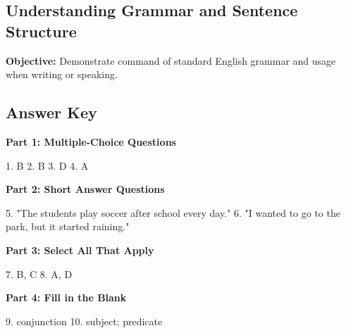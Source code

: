 \documentclass[12pt]{article}
\begin{document}
\subsection*{Understanding Grammar and Sentence Structure}
\onehalfspacing

\begin{tcolorbox}[colframe=black!40, colback=gray!0, title=Learning Objective]
\textbf{Objective:} Demonstrate command of standard English grammar and usage when writing or speaking.
\end{tcolorbox}

\subsection*{Answer Key}

\textbf{Part 1: Multiple-Choice Questions}

1. B  
2. B  
3. D  
4. A  

\textbf{Part 2: Short Answer Questions}

5. "The students play soccer after school every day."  
6. "I wanted to go to the park, but it started raining."  

\textbf{Part 3: Select All That Apply}

7. B, C  
8. A, D  

\textbf{Part 4: Fill in the Blank}

9. conjunction  
10. subject; predicate  
\end{document}
